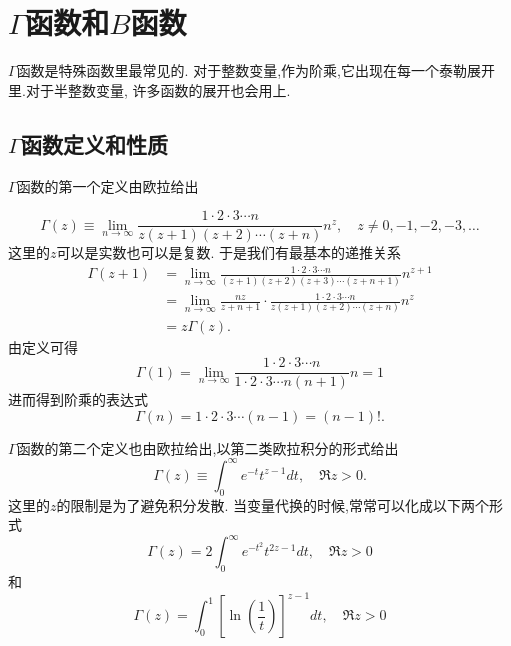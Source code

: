 \section{\texorpdfstring{$\Gamma$}{Gamma}函数和\texorpdfstring{$B$}{B}函数}
$\Gamma$函数是特殊函数里最常见的. 对于整数变量,作为阶乘,它出现在每一个泰勒展开里.对于半整数变量,
许多函数的展开也会用上.

\subsection{\texorpdfstring{$\Gamma$}{Gamma}函数定义和性质}

$\Gamma$函数的第一个定义由欧拉给出

\begin{equation}
    \Gamma(z) \equiv \lim _{n \rightarrow \infty} \frac{1 \cdot 2 \cdot 3 \cdots n}{z(z+1)(z+2) \cdots(z+n)} n^{z}, \quad z \neq 0,-1,-2,-3, \ldots
    \label{eq:gamma_def_euler}
\end{equation}
这里的$z$可以是实数也可以是复数. 于是我们有最基本的递推关系
\begin{equation}
\begin{aligned}
\Gamma(z+1) & =\lim _{n \rightarrow \infty} \frac{1 \cdot 2 \cdot 3 \cdots n}{(z+1)(z+2)(z+3) \cdots(z+n+1)} n^{z+1} \\
& =\lim _{n \rightarrow \infty} \frac{n z}{z+n+1} \cdot \frac{1 \cdot 2 \cdot 3 \cdots n}{z(z+1)(z+2) \cdots(z+n)} n^{z} \\
& =z \Gamma(z) .
\end{aligned}
\end{equation}
由定义可得
\begin{equation}
    \Gamma(1)=\lim _{n \rightarrow \infty} \frac{1 \cdot 2 \cdot 3 \cdots n}{1 \cdot 2 \cdot 3 \cdots n(n+1)} n=1
\end{equation}
进而得到阶乘的表达式
\begin{equation}
    \Gamma(n)=1 \cdot 2 \cdot 3 \cdots(n-1)=(n-1) ! .
\end{equation}

$\Gamma$函数的第二个定义也由欧拉给出,以第二类欧拉积分的形式给出
\begin{equation}
    \Gamma(z) \equiv \int_{0}^{\infty} e^{-t} t^{z-1} d t, \quad \Re z>0 .
\end{equation}
这里的$z$的限制是为了避免积分发散. 当变量代换的时候,常常可以化成以下两个形式
$$
\Gamma(z)=2 \int_{0}^{\infty} e^{-t^{2}} t^{2 z-1} d t, \quad \Re z>0
$$
和
$$
\Gamma(z)=\int_{0}^{1}\left[\ln \left(\frac{1}{t}\right)\right]^{z-1} d t, \quad \Re z>0
$$

